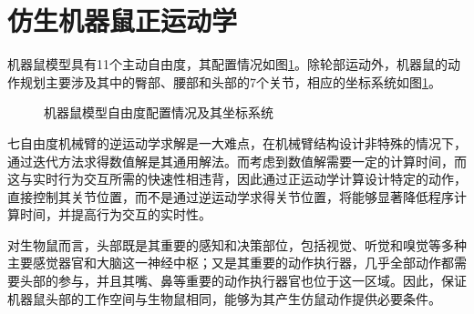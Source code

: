 \section{仿生机器鼠正运动学}
机器鼠模型具有11个主动自由度，其配置情况如图\ref{figure_kinematic}。除轮部运动外，机器鼠的动作规划主要涉及其中的臀部、腰部和头部的7个关节，相应的坐标系统如图\ref{figure_kinematic}。
\begin{figure}[htbp]
  \centering
  \caption{机器鼠模型自由度配置情况及其坐标系统}\label{figure_kinematic} %
\end{figure}

七自由度机械臂的逆运动学求解是一大难点，在机械臂结构设计非特殊的情况下，通过迭代方法求得数值解是其通用解法\cite{shimizuAnalyticalInverseKinematic2008}。而考虑到数值解需要一定的计算时间，而这与实时行为交互所需的快速性相违背，因此通过正运动学计算设计特定的动作，直接控制其关节位置，而不是通过逆运动学求得关节位置，将能够显著降低程序计算时间，并提高行为交互的实时性。

对生物鼠而言，头部既是其重要的感知和决策部位，包括视觉、听觉和嗅觉等多种主要感觉器官和大脑这一神经中枢；又是其重要的动作执行器，几乎全部动作都需要头部的参与，并且其嘴、鼻等重要的动作执行器官也位于这一区域。因此，保证机器鼠头部的工作空间与生物鼠相同，能够为其产生仿鼠动作提供必要条件。

